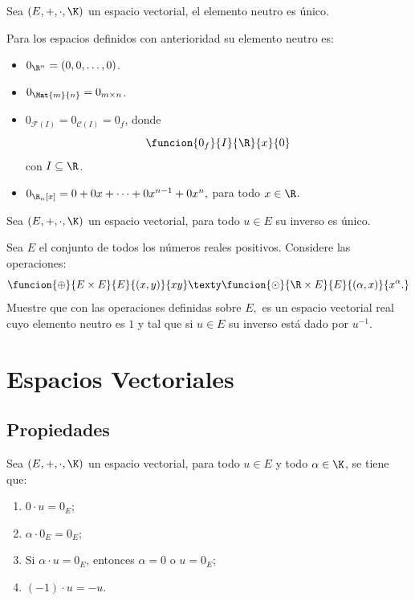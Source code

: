 \documentclass[compacto,10pt]{pubciencias-notas}
\begin{document}
\begin{prop}
Sea $(E, +, \cdot, \K)$ un espacio vectorial, el elemento neutro es único.
\end{prop}

\begin{ejem}\hspace{0pt} Para los espacios definidos con anterioridad su elemento neutro es:
\begin{itemize}
\item $0_{\R^{n}} = (0, 0, \ldots, 0)$.
\item $0_{\Mat{m}{n}} = 0_{m \times n}$.
\item $0_{\mathcal{F}(I)} = 0_{\mathcal{C}(I)} = 0_{f}$, donde
\[
    \funcion{0_{f}}{I}{\R}{x}{0}
\]
con $I\subseteq\R$.
\item $0_{\R_{n}[x]} = 0 + 0x + \cdots + 0x^{n-1} + 0x^{n},$ para todo $x\in\R$.
\end{itemize}
\end{ejem}

\begin{prop}
Sea $(E, +, \cdot, \K)$ un espacio vectorial, para todo $u\in E$ su inverso es único.
\end{prop}

\begin{ejer}\hspace{0pt} Sea $E$ el conjunto de todos los números reales positivos. Considere las operaciones:
\[
    \funcion{\oplus}{E \times E}{E}{(x, y)}{xy}
    \texty
    \funcion{\odot}{\R \times E}{E}{(\alpha, x)}{x^{\alpha}.}
\]
Muestre que con las operaciones definidas sobre $E,$ es un espacio vectorial real cuyo elemento neutro es $1$ y tal que si $u\in E$ su inverso está dado por $u^{-1}$.
\end{ejer}

\setcounter{section}{3}
\section{Espacios Vectoriales}
\setcounter{subsection}{1}
\subsection{Propiedades}

\begin{teo}
Sea $(E,+,\cdot,\K)$ un espacio vectorial, para todo $u \in E$ y todo $\alpha \in \K$, se tiene que:
\begin{enumerate}
\item $0\cdot u = 0_{E}$;
\item $\alpha \cdot 0_{E} = 0_{E}$;
\item Si $\alpha \cdot u=0_{E}$, entonces $\alpha  = 0$ o $u = 0_{E}$;
\item $(-1) \cdot u = -u$.
\end{enumerate}
\end{teo}
\end{document}
